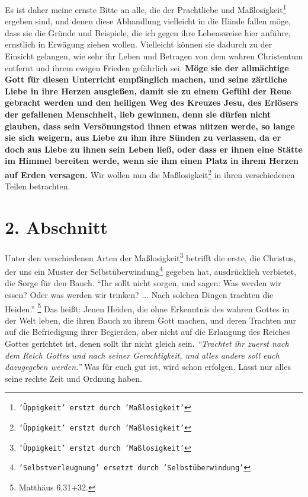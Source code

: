 Es ist daher meine
ernste Bitte an alle, die der Prachtliebe und Maßlosigkeit\footnote{\texttt{'Üppigkeit' erstzt durch
'Maßlosigkeit'}} ergeben sind, und
denen diese Abhandlung vielleicht in die Hände fallen möge, dass sie die Gründe
und Beispiele, die ich gegen ihre Lebensweise hier anführe, ernstlich in
Erwägung ziehen wollen. Vielleicht können sie dadurch zu der Einsicht gelangen,
wie sehr ihr Leben und Betragen von dem wahren Christentum entfernt 
und ihrem
ewigen Frieden gefährlich sei. \label{ref:14_01_wahre_nachfolger_suenetod}
\textbf{Möge sie der allmächtige Gott für diesen
Unterricht empfänglich machen, und seine zärtliche Liebe in ihre Herzen
ausgießen, damit sie zu einem Gefühl der Reue gebracht werden 
und den heiligen
Weg des Kreuzes Jesu, des Erlösers der gefallenen 
Menschheit, lieb gewinnen,
denn sie dürfen nicht glauben, dass sein Versönungstod ihnen etwas nützen werde,
so lange sie sich weigern, aus Liebe zu ihm ihre Sünden zu verlassen, da er doch
aus Liebe zu ihnen sein Leben ließ, oder dass er ihnen eine Stätte im Himmel
bereiten werde, wenn sie ihm einen Platz in ihrem Herzen auf Erden versagen.} Wir
wollen nun die Maßlosigkeit\footnote{\texttt{'Üppigkeit' erstzt durch 'Maßlosigkeit'}} 
in ihren verschiedenen Teilen betrachten.

\section{2. Abschnitt} \label{kap14_ab2}

Unter den verschiedenen Arten der Maßlosigkeit\footnote{\texttt{'Üppigkeit' 
erstzt durch 'Maßlosigkeit'}} betrifft die erste, die Christus,
der uns ein Muster der Selbstüberwindung\footnote{\texttt{'Selbstverleugnung' 
ersetzt durch 'Selbstüberwindung'}} gegeben hat, ausdrücklieh verbietet,
die Sorge für den Bauch.
"`Ihr sollt nicht sorgen, und sagen: Was werden wir
essen? Oder was werden wir trinken? ... Nach solchen Dingen trachten die
Heiden."'
\footnote{Matthäus 6,31+32.}
Das heißt: Jenen Heiden, die ohne
Erkenntnis des wahren Gottes in der Welt leben, die ihren Bauch zu ihrem Gott
machen, und deren Trachten nur auf die Befriedigung ihrer Begierden, aber nicht
auf die Erlangung des Reiches Gottes gerichtet ist, denen sollt ihr nicht gleich
sein.
\textit{"`Trachtet ihr zuerst nach dem Reich Gottes und nach seiner
Gerechtigkeit, und alles andere soll euch dazugegeben werden."'} Was für euch gut
ist, wird schon erfolgen. Lasst nur alles seine rechte Zeit und Ordnung haben.

